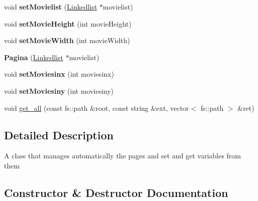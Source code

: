 \begin{DoxyCompactItemize}
\mbox{\label{classPagina_ae05a819c5c42923ac14cb13e6f94501d}} 
void {\bfseries set\+Movielist} (\hyperlink{classLinkedlist}{Linkedlist} $\ast$movielist)
\item 
\mbox{\label{classPagina_a98413d9ba7c69440000988c3514395da}} 
void {\bfseries set\+Movie\+Height} (int movie\+Height)
\item 
\mbox{\label{classPagina_a6ec7bffad49e0f01a3bc1a2dba9e32f0}} 
void {\bfseries set\+Movie\+Width} (int movie\+Width)
\item 
\mbox{\label{classPagina_add207a0e0d05bf50b0ac013cd78bf8db}} 
{\bfseries Pagina} (\hyperlink{classLinkedlist}{Linkedlist} $\ast$movielist)
\item 
\mbox{\label{classPagina_a8ae1fc8168e660da6d6b0a143bc6b44a}} 
void {\bfseries set\+Moviesinx} (int moviesinx)
\item 
\mbox{\label{classPagina_ad095837668b83d63f233b1803b6dad26}} 
void {\bfseries set\+Moviesiny} (int moviesiny)
\item 
void \hyperlink{classPagina_a6add287b069713f6e424d107989c3742}{get\+\_\+all} (const fs\+::path \&root, const string \&ext, vector$<$ fs\+::path $>$ \&ret)
\end{DoxyCompactItemize}


\subsection{Detailed Description}
A class that manages automatically the pages and set and get variables from them 

\subsection{Constructor \& Destructor Documentation}
\mbox{\label{classPagina_a5f1b14b8a4d53e8c155dd6727444e875}} 
